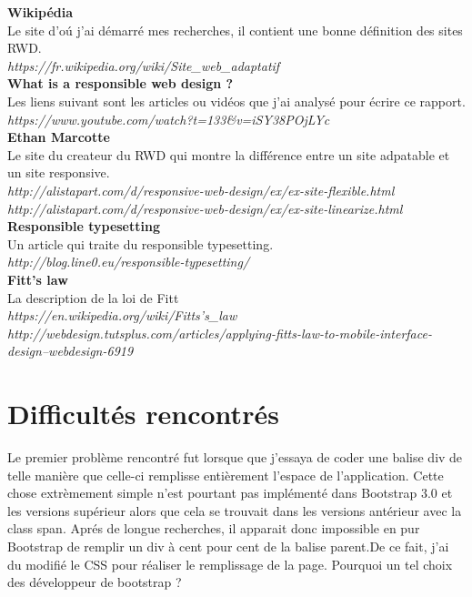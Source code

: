 \documentclass{article}
\begin{document}
\textbf{Wikip\'edia}\\
Le site d'o\'u j'ai d\'emarr\'e mes recherches, il contient une bonne d\'efinition des sites RWD.\\
\textit{https://fr.wikipedia.org/wiki/Site\_web\_adaptatif}
\vspace{0.5cm}\\
\textbf{What is a responsible web design ?}\\
Les liens suivant sont les articles ou vid\'eos que j'ai analys\'e pour \'ecrire ce rapport.\\
\textit{https://www.youtube.com/watch?t=133\&v=iSY38POjLYc}
\vspace{0.5cm}\\
\textbf{Ethan Marcotte}\\
Le site du createur du RWD qui montre la diff\'erence entre un site adpatable et un site responsive.\\
\textit{http://alistapart.com/d/responsive-web-design/ex/ex-site-flexible.html}\\
\textit{http://alistapart.com/d/responsive-web-design/ex/ex-site-linearize.html}
\vspace{0.5cm}\\
\textbf{Responsible typesetting}\\
Un article qui traite du responsible typesetting.\\
\textit{http://blog.line0.eu/responsible-typesetting/}
\vspace{0.5cm}\\
\textbf{Fitt's law}\\
La description de la loi de Fitt\\
\textit{https://en.wikipedia.org/wiki/Fitts's\_law}\\
\textit{http://webdesign.tutsplus.com/articles/applying-fitts-law-to-mobile-interface-design--webdesign-6919}



\section{Difficult\'es rencontr\'es}
\hspace*{0.6cm}Le premier probl\`eme rencontr\'e fut lorsque que j'essaya de coder une balise div de telle mani\`ere que celle-ci remplisse enti\`erement l'espace de l'application. Cette chose extr\`emement simple n'est pourtant pas impl\'ement\'e dans Bootstrap 3.0 et les versions sup\'erieur alors que cela se trouvait dans les versions ant\'erieur avec la class span. Apr\'es de longue recherches, il apparait donc impossible en pur Bootstrap de remplir un div \`a cent pour cent de la balise parent.De ce fait, j'ai du modifi\'e le CSS pour r\'ealiser le remplissage de la page. Pourquoi un tel choix des d\'eveloppeur de bootstrap ?
\end{document}
